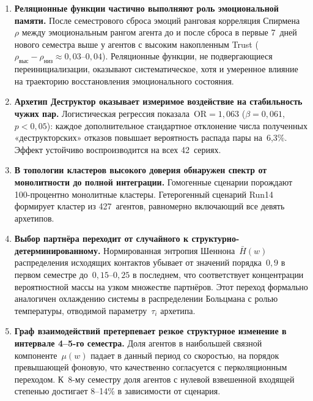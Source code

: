 \documentclass[12pt]{article}
\begin{document}
\begin{enumerate}
    \item \textbf{Реляционные функции частично выполняют роль
          эмоциональной памяти.}
          После семестрового сброса эмоций ранговая корреляция
          Спирмена~$\rho$ между эмоциональным рангом агента до и после
          сброса в первые 7~дней нового семестра выше у агентов
          с высоким накопленным Trust ($\rho_{\text{выс}} - \rho_{\text{низ}}
          \approx 0{,}03$--$0{,}04$).
          Реляционные функции, не подвергающиеся переинициализации,
          оказывают систематическое, хотя и умеренное влияние на
          траекторию восстановления эмоционального состояния.

    \item \textbf{Архетип Деструктор оказывает измеримое воздействие
          на стабильность чужих пар.}
          Логистическая регрессия показала~$\mathrm{OR} = 1{,}063$
          ($\beta = 0{,}061$, $p < 0{,}05$): каждое дополнительное
          стандартное отклонение числа полученных «деструкторских»
          отказов повышает вероятность распада пары на~6,3\%.
          Эффект устойчиво воспроизводится на всех 42~сериях.

    \item \textbf{В топологии кластеров высокого доверия обнаружен
          спектр от монолитности до полной интеграции.}
          Гомогенные сценарии порождают 100-процентно монолитные
          кластеры.
          Гетерогенный сценарий Run14 формирует кластер из 427~агентов,
          равномерно включающий все девять архетипов.

    \item \textbf{Выбор партнёра переходит от случайного к
          структурно-детерминированному.}
          Нормированная энтропия Шеннона~$\bar{H}(w)$ распределения
          исходящих контактов убывает от значений порядка~$0{,}9$
          в первом семестре до~$0{,}15$--$0{,}25$ в последнем,
          что соответствует концентрации вероятностной массы
          на узком множестве партнёров.
          Этот переход формально аналогичен охлаждению системы в
          распределении Больцмана с ролью температуры,
          отводимой параметру~$\tau_i$ архетипа.

    \item \textbf{Граф взаимодействий претерпевает резкое структурное
          изменение в интервале 4--5-го семестра.}
          Доля агентов в наибольшей связной компоненте~$\mu(w)$
          падает в данный период со скоростью, на порядок превышающей
          фоновую, что качественно согласуется с перколяционным
          переходом.
          К~8-му семестру доля агентов с нулевой взвешенной
          входящей степенью достигает 8--14\% в зависимости от
          сценария.


\end{enumerate}
\end{document}
